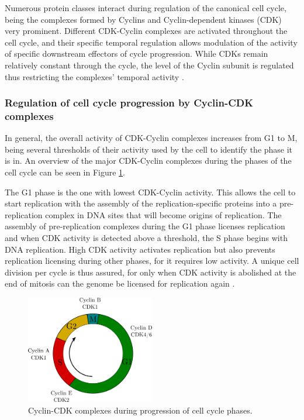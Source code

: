 \documentclass[11pt,twoside,a4paper]{report}
\begin{document}
			Numerous protein classes interact during regulation of the canonical cell cycle, being the complexes formed by Cyclins and Cyclin-dependent kinases (CDK) very prominent. Different CDK-Cyclin complexes are activated throughout the cell cycle, and their specific temporal regulation allows modulation of the activity of specific downstream effectors of cycle progression. While CDKs remain relatively constant through the cycle, the level of the Cyclin subunit is regulated thus restricting the complexes' temporal activity \cite{DavidA.Orlando2CharlesY.Lin1AllisterBernard3JeanY.Wang1JoshuaE.S.Socolar4EdwinS.Iversen52008}. 
			
				\subsubsection{Regulation of cell cycle progression by Cyclin-CDK complexes}
				In general, the overall activity of CDK-Cyclin complexes increases from G1 to M, being several thresholds of their activity used by the cell to identify the phase it is in. An overview of the major CDK-Cyclin complexes during the phases of the cell cycle can be seen in Figure \ref{fig:cellcycle_complex}.
				
				The G1 phase is the one with lowest CDK-Cyclin activity. This allows the cell to start replication with the assembly of the replication-specific proteins into a pre-replication complex in DNA sites that will become origins of replication. The assembly of pre-replication complexes during the G1 phase licenses replication and when CDK activity is detected above a threshold, the S phase begins with DNA replication. High CDK activity activates replication but also prevents replication licensing during other phases, for it requires low activity. A unique cell division per cycle is thus assured, for only when CDK activity is abolished at the end of mitosis can the genome be licensed for replication again \cite{Sclafani2007}.
				
				\begin{figure}[here]
					\centering
					\includegraphics[width=0.5\textwidth]{pngs/cell_cycle_complex.png}
					\caption[Cyclin-CDK complexes during progression of cell cycle phases]
					{Cyclin-CDK complexes during progression of cell cycle phases.}
					\label{fig:cellcycle_complex}
				\end{figure}
								
\end{document}
